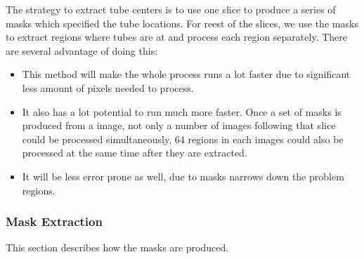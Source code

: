 The strategy to extract tube centers is to use one slice to produce a series of masks which specified the tube
locations. For reest of the slices, we use the masks to extract regions where tubes are at and process each
region separately. There are several advantage of doing this:
\begin{itemize}
\item This method will make the whole process runs a lot faster due to significant less amount of pixels needed
  to process.
\item It also has a lot potential to run much more faster. Once 
  a set of masks is produced from a image, not only a number of images following that slice could be processed
  simultaneously, 64 regions in each images could also be processed at the same time after they are extracted.
\item It will be less error prone as well, due to masks narrows down the problem regions.
\end{itemize}

\subsubsection{Mask Extraction}
This section describes how the masks are produced.

